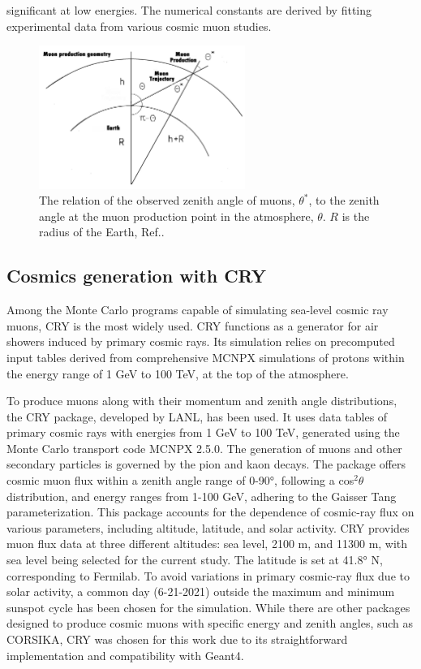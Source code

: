 significant at low energies. The numerical constants are derived by fitting experimental data from various cosmic muon studies.
\begin{figure}[!h]
    \centering
    \includegraphics[width =0.6\textwidth]{figures/png/Screenshot_20240526_140716.png}
    \caption{The relation of the observed zenith angle of muons, $\theta^*$, to the zenith angle at the muon production point in the atmosphere, $\theta$. 
    $R$ is the radius of the Earth, Ref.\cite{guan2015parametrization}.}
    \label{fig:anglesinmuon}
\end{figure}

\subsection{Cosmics generation with CRY}
Among the Monte Carlo programs capable of simulating sea-level cosmic ray muons, 
CRY is the most widely used. CRY functions as a generator for air showers induced by primary cosmic rays. 
Its simulation relies on precomputed input tables derived from comprehensive MCNPX simulations of protons 
within the energy range of 1 GeV to 100 TeV, at the top of the atmosphere.

To produce muons along with their momentum and zenith angle distributions, 
the CRY package, developed by LANL, has been used. It uses data tables of primary 
cosmic rays with energies from 1 GeV to 100 TeV, generated using the Monte Carlo transport code MCNPX 2.5.0. 
The generation of muons and other secondary particles is governed by the pion and kaon decays. 
The package offers cosmic muon flux within a zenith angle range of 0-90°, following a cos$^2 \theta$ distribution, 
and energy ranges from 1-100 GeV, adhering to the Gaisser Tang parameterization. 
This package accounts for the dependence of cosmic-ray flux on various parameters, including altitude, latitude, and solar activity.
CRY provides muon flux data at three different altitudes: sea level, 2100 m, and 11300 m, with sea level being selected for the current study. 
The latitude is set at 41.8° N, corresponding to Fermilab. 
To avoid variations in primary cosmic-ray flux due to solar activity, a common day (6-21-2021) outside the maximum and minimum sunspot cycle has been chosen for the simulation.
While there are other packages designed to produce cosmic muons with specific energy and zenith angles, 
such as CORSIKA, CRY was chosen for this work due to its straightforward implementation and compatibility with Geant4.

